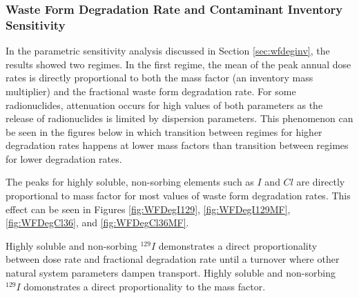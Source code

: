 \subsubsection{Waste Form Degradation Rate and Contaminant Inventory Sensitivity}

In the parametric sensitivity analysis discussed in Section 
\ref{sec:wfdeginv}, the results showed two regimes. In the first regime, the 
mean of the peak annual dose rates is directly proportional to both the mass 
factor (an inventory mass multiplier) and the fractional waste 
form degradation rate. For some radionuclides, attenuation occurs for high 
values of both parameters as the release of radionuclides is limited by 
dispersion parameters. This phenomenon can be seen in the figures below in which 
transition between regimes for higher degradation rates happens at lower mass 
factors than transition between regimes for lower degradation rates. 

The peaks for highly soluble, non-sorbing elements such as $I$ and $Cl$
are directly proportional to mass factor for most 
values of waste form degradation rates. This effect can be seen in Figures 
\ref{fig:WFDegI129}, \ref{fig:WFDegI129MF}, \ref{fig:WFDegCl36}, and 
\ref{fig:WFDegCl36MF}. 


Highly soluble and non-sorbing $^{129}I$ demonstrates a direct proportionality between dose rate and 
fractional degradation rate until a turnover where other natural system 
parameters dampen transport. Highly soluble and non-sorbing $^{129}I$ domonstrates a direct 
proportionality to the mass factor.

